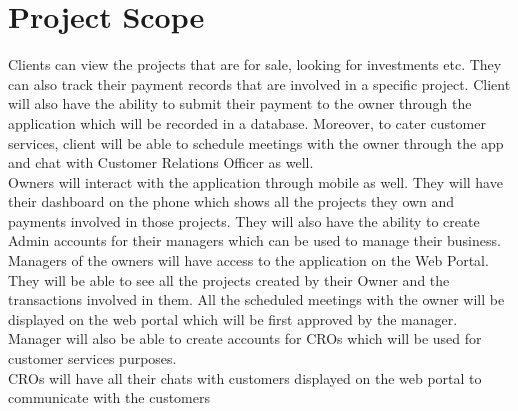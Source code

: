 \section{Project Scope}
Clients can view the projects that are for sale, looking for investments etc. They can also track their payment records that are involved in a specific project. Client will also have the ability to submit their payment to the owner through the application which will be recorded in a database. Moreover, to cater customer services, client will be able to schedule meetings with the owner through the app and chat with Customer Relations Officer as well.\\
Owners will interact with the application through mobile as well. They will have their dashboard on the phone which shows all the projects they own and payments involved in those projects. They will also have the ability to create Admin accounts for their managers which can be used to manage their business.\\
Managers of the owners will have access to the application on the Web Portal. They will be able to see all the projects created by their Owner and the transactions involved in them. All the scheduled meetings with the owner will be displayed on the web portal which will be first approved by the manager. Manager will also be able to create accounts for CROs which will be used for customer services purposes.\\
CROs will have all their chats with customers displayed on the web portal to communicate with the customers
